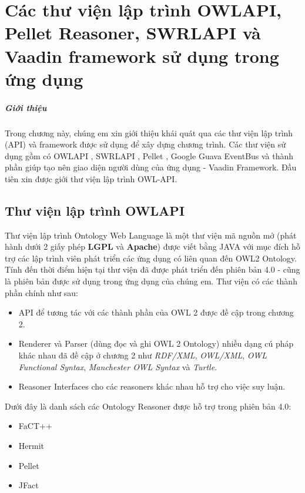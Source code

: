 \chapter{Các thư viện lập trình OWLAPI, Pellet Reasoner, SWRLAPI và Vaadin framework sử dụng trong ứng dụng}
\paragraph{Giới thiệu} Trong chương này, chúng em xin giới thiệu khái quát qua các thư viện lập trình (API) và framework được sử dụng để xây dựng chương trình. Các thư viện sử dụng gồm có OWLAPI \cite{owlapi}, SWRLAPI \cite{swrlapi}, Pellet \cite{pellet}, Google Guava EventBus và thành phần giúp tạo nên giao diện người dùng của ứng dụng - Vaadin Framework. Đầu tiên xin được giới thư viện lập trình OWL-API.
\section{Thư viện lập trình OWLAPI}
Thư viện lập trình Ontology Web Language là một thư viện mã nguồn mở (phát hành dưới 2 giấy phép \textbf{LGPL} và \textbf{Apache}) \cite{owlapi} được viết bằng JAVA với mục đích hỗ trợ các lập trình viên phát triển các ứng dụng có liên quan đến OWL2 Ontology. Tính đến thời điểm hiện tại thư viện đã được phát triển đến phiên bản 4.0 - cũng là phiên bản được sử dụng trong ứng dụng của chúng em.
Thư viện có các thành phần chính như sau: 
\begin{itemize}
\item API để tương tác với các thành phần của OWL 2 được đề cập trong chương 2.
\item Renderer và Parser (dùng đọc và ghi OWL 2 Ontology) nhiều dạng cú pháp khác nhau đã đề cập ở chương 2 như \textit{RDF/XML}, \textit{OWL/XML}, \textit{OWL Functional Syntax}, \textit{Manchester OWL Syntax} và \textit{Turtle}.
\item Reasoner Interfaces cho các reasoners khác nhau hỗ trợ cho việc suy luận.
\end{itemize}
Dưới đây là danh sách các Ontology Reasoner được hỗ trợ trong phiên bản 4.0:
\begin{itemize}
\item FaCT++ 
\item Hermit
\item Pellet \cite{pellet}
\item JFact 
\end{itemize}
